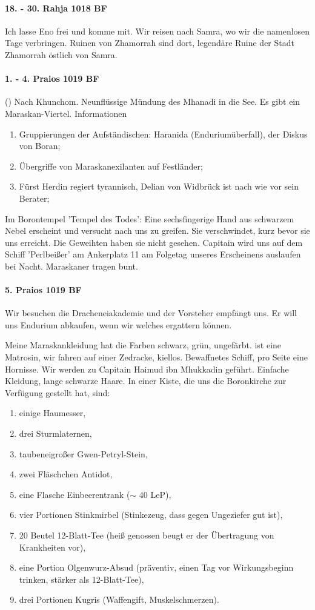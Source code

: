 \paragraph{18. - 30. Rahja 1018 BF}
Ich lasse Eno frei und komme mit. Wir reisen nach Samra, wo wir die namenlosen Tage verbringen. Ruinen von Zhamorrah sind dort, legendäre Ruine der Stadt Zhamorrah östlich von Samra. 

\paragraph{1. - 4. Praios 1019 BF}
()
Nach Khunchom. Neunflüssige Mündung des Mhanadi in die See. Es gibt ein Maraskan-Viertel. Informationen
\begin{enumerate}
\item Gruppierungen der Aufständischen: Haranida (Enduriumüberfall), der Diskus von Boran;
\item Übergriffe von Maraskanexilanten auf Festländer;
\item Fürst Herdin regiert tyrannisch, Delian von Widbrück ist nach wie vor sein Berater; 
\end{enumerate}
Im Borontempel 'Tempel des Todes': Eine sechsfingerige Hand aus schwarzem Nebel erscheint und versucht nach uns zu greifen. Sie verschwindet, kurz bevor sie uns erreicht. Die Geweihten haben sie nicht gesehen. Capitain  wird uns auf dem Schiff 'Perlbeißer' am Ankerplatz 11 am Folgetag unseres Erscheinens auslaufen bei Nacht. Maraskaner tragen bunt.

\paragraph{5. Praios 1019 BF}
Wir besuchen die Dracheneiakademie und der Vorsteher empfängt uns. Er will uns Endurium abkaufen, wenn wir welches ergattern können.

Meine Maraskankleidung hat die Farben schwarz, grün, ungefärbt.  ist eine Matrosin, wir fahren auf einer Zedracke, kiellos. Bewaffnetes Schiff, pro Seite eine Hornisse. Wir werden zu Capitain Haimud ibn Mhukkadin geführt. Einfache Kleidung, lange schwarze Haare. In einer Kiste, die uns die Boronkirche zur Verfügung gestellt hat, sind:
\begin{enumerate}
\item einige Haumesser, 
\item drei Sturmlaternen,
\item taubeneigroßer Gwen-Petryl-Stein,
\item zwei Fläschchen Antidot,
\item eine Flasche Einbeerentrank ($\sim$ 40 LeP),
\item vier Portionen Stinkmirbel (Stinkezeug, dass gegen Ungeziefer gut ist),
\item 20 Beutel 12-Blatt-Tee (heiß genossen beugt er der Übertragung von Krankheiten vor), 
\item eine Portion Olgenwurz-Absud (präventiv, einen Tag vor Wirkungsbeginn trinken, stärker als 12-Blatt-Tee),
\item drei Portionen Kugris (Waffengift, Muskelschmerzen).
\end{enumerate}

